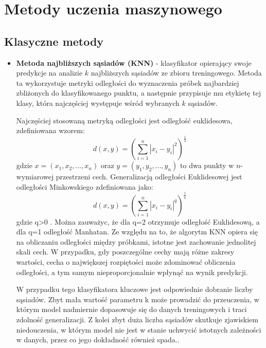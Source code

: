 \documentclass[a4paper,twoside,12pt]{book}
\begin{document}
\chapter{Metody uczenia maszynowego}
\section{Klasyczne metody}
\begin{itemize}
	\item \textbf{Metoda najbliższych sąsiadów (KNN)} - klasyfikator opierający swoje predykcje na analizie $k$ najbliższych sąsiadów ze zbioru treningowego. Metoda ta wykorzystuje metryki odległości do wyznaczenia próbek najbardziej zbliżonych do klasyfikowanego punktu, a następnie przypisuje mu etykietę tej klasy, która najczęściej występuje wśród wybranych $k$ sąsiadów.

	      Najczęściej stosowaną metryką odległości jest odległość euklidesowa, zdefiniowana wzorem:
	      \begin{equation}
		      d(x, y) = \left( \sum_{i=1}^{n} |x_i - y_i|^{2} \right)^{\frac{1}{2}}
	      \end{equation}
	      gdzie $x = (x_1, x_2, \ldots, x_n)$ oraz $y = (y_1, y_2, \ldots, y_n)$ to dwa punkty w $n$-wymiarowej przestrzeni cech. Generalizacją odległości Euklidesowej jest odległości Minkowskiego zdefiniowana jako:
	      \begin{equation}
		      d(x, y) = \left( \sum_{i=1}^{n} |x_i - y_i|^{q} \right)^{\frac{1}{q}}
	      \end{equation}
	      gdzie q>0 \cite{liu2007web}. Można zauważyc, że dla q=2 otrzymuje odległość Euklidesową, a dla q=1 odległość Manhatan.
	      Ze względu na to, że algorytm KNN opiera się na obliczaniu odległości między próbkami, istotne jest zachowanie jednolitej skali cech. W przypadku, gdy poszczególne cechy mają różne zakresy wartości, cecha o największej rozpiętości może zdominować obliczenia odległości, a tym samym nieproporcjonalnie wpłynąć na wynik predykcji.

	      W przypadku tego klasyfikatora kluczowe jest odpowiednie dobranie liczby sąsiadów. Zbyt mała wartość parametru k może prowadzić do przeuczenia, w którym model nadmiernie dopasowuje się do danych treningowych i traci zdolność generalizacji. Z kolei zbyt duża liczba sąsiadów skutkuje zjawiskiem niedouczenia, w którym model nie jest w stanie uchwycić istotnych zależności w danych, przez co jego dokładność również spada.\cite{kuhn2013applied}.


\end{itemize}
\end{document}

